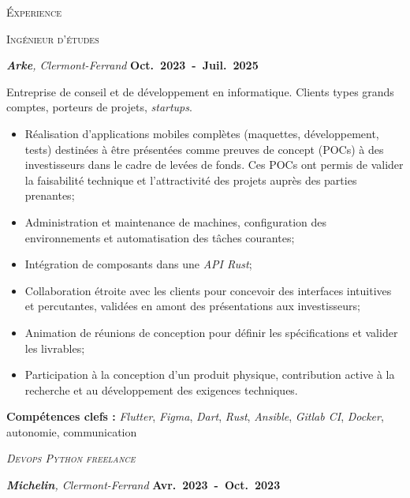 \documentclass[10pt, a4paper]{article}
\newcommand{\dates}[1]{\hfill\mbox{\textbf{#1}}}
\newcommand{\headright}[1]{\vspace*{2.5ex}\textsc{\Large\color{accent}#1}\par%
     \vspace*{-2ex}{\color{accent}\hrulefill}\par}
\begin{document}
\begin{minipage}[t]{0.56\textwidth}
\setlength{\parskip}{0.8ex}%

\vspace{2ex}

\headright{Éxperience}

\textsc{Ingénieur d'études}

\textit{\textbf{Arke}, Clermont-Ferrand}  \dates{Oct. 2023 - Juil. 2025}

{\small
Entreprise de conseil et de développement en informatique. Clients types grands comptes, porteurs de projets, \emph{startups}.

\begin{itemize}
    \item Réalisation d’applications mobiles complètes (maquettes, développement, tests) destinées à être présentées comme preuves de concept (POCs) à des investisseurs dans le cadre de levées de fonds. Ces POCs ont permis de valider la faisabilité technique et l’attractivité des projets auprès des parties prenantes;
    \item Administration et maintenance de machines, configuration des environnements et automatisation des tâches courantes;
    \item Intégration de composants dans une \emph{API Rust};
    \item Collaboration étroite avec les clients pour concevoir des interfaces intuitives et percutantes, validées en amont des présentations aux investisseurs;
    \item Animation de réunions de conception pour définir les spécifications et valider les livrables;
    \item Participation à la conception d’un produit physique, contribution active à la recherche et au développement des exigences techniques.
\end{itemize}

\textbf{Compétences clefs :} \emph{Flutter}, \emph{Figma}, \emph{Dart}, \emph{Rust}, \emph{Ansible}, \emph{Gitlab CI}, \emph{Docker}, autonomie, communication
}

\medskip

\textsc{\emph{Devops Python freelance}}

\textit{\textbf{Michelin}, Clermont-Ferrand} \dates{Avr. 2023 - Oct. 2023}

{\small

}
\end{minipage}
\end{document}
